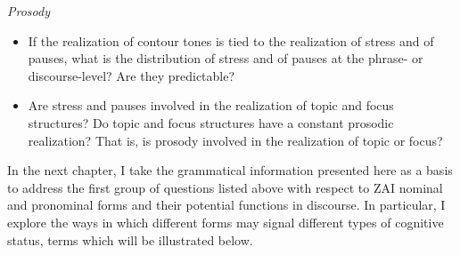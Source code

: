 \vspace{3mm}
\noindent \textit{Prosody}
\begin{itemize}
\item If the realization of contour tones is tied to the realization of stress and of pauses, what is the distribution of stress and of pauses at the phrase- or discourse-level? Are they predictable? 
\item Are stress and pauses involved in the realization of topic and focus structures? Do topic and focus structures have a constant prosodic realization? That is, is prosody involved in the realization of topic or focus?
\end{itemize}


In the next chapter, I take the grammatical information presented here as a basis to address the first group of questions listed above with respect to ZAI nominal and pronominal forms and their potential functions in discourse. In particular, I explore the ways in which different forms may signal different types of cognitive status, terms which will be illustrated below. 

